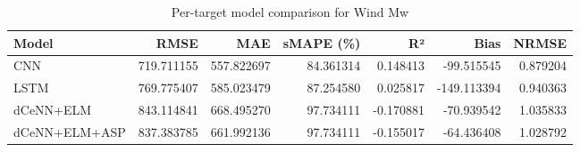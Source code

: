 \begin{table}
\caption{Per-target model comparison for Wind Mw}
\begin{tabular}{lrrrrrr}
\toprule
Model & RMSE & MAE & sMAPE (\%) & R² & Bias & NRMSE \\
\midrule
CNN & 719.711155 & 557.822697 & 84.361314 & 0.148413 & -99.515545 & 0.879204 \\
LSTM & 769.775407 & 585.023479 & 87.254580 & 0.025817 & -149.113394 & 0.940363 \\
dCeNN+ELM & 843.114841 & 668.495270 & 97.734111 & -0.170881 & -70.939542 & 1.035833 \\
dCeNN+ELM+ASP & 837.383785 & 661.992136 & 97.734111 & -0.155017 & -64.436408 & 1.028792 \\
\bottomrule
\end{tabular}
\end{table}
